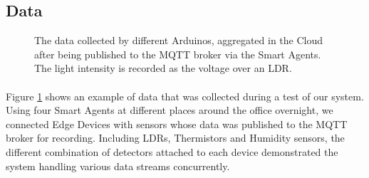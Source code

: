 

\subsection{Data}

\begin{figure}
    \centering
    \caption{The data collected by different Arduinos, aggregated in the Cloud after being published to the MQTT broker via the Smart Agents. The light intensity is recorded as the voltage over an LDR.}
    \label{fig:graph}
\end{figure}

\paragraph{}
Figure \ref{fig:graph} shows an example of data that was collected during a test of our system. Using four Smart Agents at different places around the office overnight, we connected Edge Devices with sensors whose data was published to the MQTT broker for recording. Including LDRs, Thermistors and Humidity sensors, the different combination of detectors attached to each device demonstrated the system handling various data streams concurrently.

